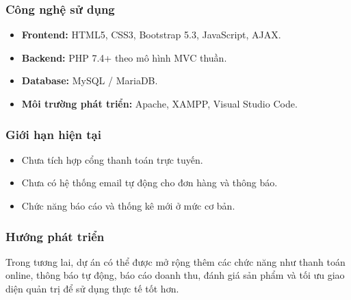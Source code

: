 \subsubsection{Công nghệ sử dụng}

\begin{itemize}
    \item \textbf{Frontend:} HTML5, CSS3, Bootstrap 5.3, JavaScript, AJAX.
    \item \textbf{Backend:} PHP 7.4+ theo mô hình MVC thuần.
    \item \textbf{Database:} MySQL / MariaDB.
    \item \textbf{Môi trường phát triển:} Apache, XAMPP, Visual Studio Code.
\end{itemize}

\subsubsection{Giới hạn hiện tại}

\begin{itemize}
    \item Chưa tích hợp cổng thanh toán trực tuyến.
    \item Chưa có hệ thống email tự động cho đơn hàng và thông báo.
    \item Chức năng báo cáo và thống kê mới ở mức cơ bản.
\end{itemize}

\subsubsection{Hướng phát triển}

Trong tương lai, dự án có thể được mở rộng thêm các chức năng như thanh toán online, thông báo tự động, báo cáo doanh thu, đánh giá sản phẩm và tối ưu giao diện quản trị để sử dụng thực tế tốt hơn.
